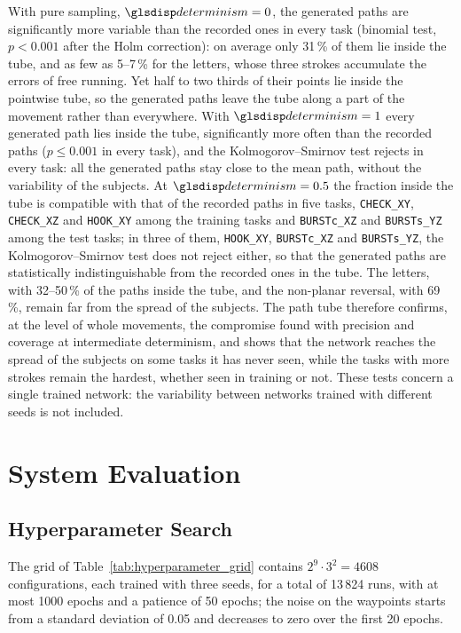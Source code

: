 \documentclass[12pt]{report}
\begin{document}
With pure sampling, $\sym{determinism}=0$, the generated paths are significantly more variable than the recorded ones in every task (binomial test, $p<0.001$ after the Holm correction): on average only 31\,\% of them lie inside the tube, and as few as 5--7\,\% for the letters, whose three strokes accumulate the errors of free running. Yet half to two thirds of their points lie inside the pointwise tube, so the generated paths leave the tube along a part of the movement rather than everywhere. With $\sym{determinism}=1$ every generated path lies inside the tube, significantly more often than the recorded paths ($p\le0.001$ in every task), and the Kolmogorov--Smirnov test rejects in every task: all the generated paths stay close to the mean path, without the variability of the subjects. At $\sym{determinism}=0.5$ the fraction inside the tube is compatible with that of the recorded paths in five tasks, \texttt{CHECK\_XY}, \texttt{CHECK\_XZ} and \texttt{HOOK\_XY} among the training tasks and \texttt{BURSTc\_XZ} and \texttt{BURSTs\_YZ} among the test tasks; in three of them, \texttt{HOOK\_XY}, \texttt{BURSTc\_XZ} and \texttt{BURSTs\_YZ}, the Kolmogorov--Smirnov test does not reject either, so that the generated paths are statistically indistinguishable from the recorded ones in the tube. The letters, with 32--50\,\% of the paths inside the tube, and the non-planar reversal, with 69\,\%, remain far from the spread of the subjects. The path tube therefore confirms, at the level of whole movements, the compromise found with precision and coverage at intermediate determinism, and shows that the network reaches the spread of the subjects on some tasks it has never seen, while the tasks with more strokes remain the hardest, whether seen in training or not. These tests concern a single trained network: the variability between networks trained with different seeds is not included.

\section{System Evaluation}
\label{sec:system_evaluation}

\subsection{Hyperparameter Search}
\label{sec:hyperparameter_search}
The grid of Table~\ref{tab:hyperparameter_grid} contains $2^9\cdot3^2=4608$ configurations, each trained with three seeds, for a total of 13\,824 runs, with at most 1000 epochs and a patience of 50 epochs; the noise on the waypoints starts from a standard deviation of 0.05 and decreases to zero over the first 20 epochs.
\end{document}
